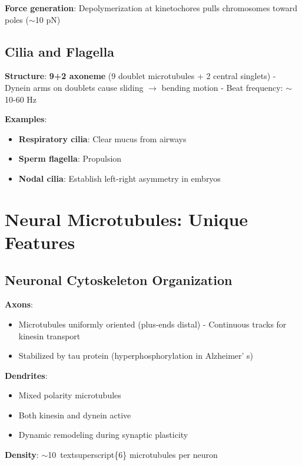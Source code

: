 \textbf{Force generation}: Depolymerization at kinetochores pulls
chromosomes toward poles ($\sim$10 pN)

\subsection{Cilia and Flagella}\label{cilia-and-flagella}

\textbf{Structure}: \textbf{9+2 axoneme} (9 doublet microtubules + 2
central singlets) - Dynein arms on doublets cause sliding
$\rightarrow$ bending motion - Beat frequency:
$\sim$10-60 Hz

\textbf{Examples}:
\begin{itemize}
\item \textbf{Respiratory cilia}: Clear mucus from
airways
\item \textbf{Sperm flagella}: Propulsion
\item \textbf{Nodal cilia}:
Establish left-right asymmetry in embryos
\end{itemize}


\section{Neural Microtubules: Unique Features}
\label{sec:neural-microtubules}

\subsection{Neuronal Cytoskeleton
Organization}\label{neuronal-cytoskeleton-organization}

\textbf{Axons}:
\begin{itemize}
\item Microtubules uniformly oriented (plus-ends distal) -
Continuous tracks for kinesin transport
\item Stabilized by tau protein
(hyperphosphorylation in Alzheimer' s)
\end{itemize}


\textbf{Dendrites}:
\begin{itemize}
\item Mixed polarity microtubules
\item Both kinesin and
dynein active
\item Dynamic remodeling during synaptic plasticity
\end{itemize}


\textbf{Density}: $\sim$10\ textsuperscript\{6\}
microtubules per neuron

